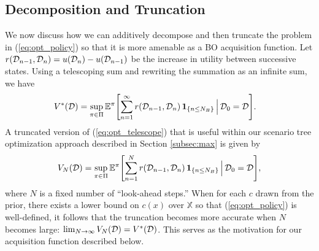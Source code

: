 \subsection{Decomposition and Truncation}
We now discuss how we can additively decompose and then truncate the problem in (\ref{eq:opt_policy}) so that it is more amenable as a BO acquisition function. Let $r(\mathcal{D}_{n-1}, \mathcal{D}_{n}) = u(\mathcal{D}_{n}) - u(\mathcal{D}_{n-1})$ be the increase in utility between successive states. Using a telescoping sum and rewriting the summation as an infinite sum, we have
\begin{align}
   V^*(\mathcal{D}) &= 
   \sup_{\pi\in\Pi} \mathbb{E}^{\pi}\Biggl[ \sum_{n=1}^{\infty} r(\mathcal{D}_{n-1},\mathcal{D}_n) \, \mathbf{1}_{\{n \le N_B\}}  \, \Bigl | \, \mathcal{D}_0 = \mathcal{D}\Biggr].
   \label{eq:opt_telescope}
\end{align}
A truncated version of (\ref{eq:opt_telescope}) that is useful within our scenario tree optimization approach described in Section \ref{subsec:max} is given by
\begin{align}
   V_N(\mathcal{D}) = \sup_{\pi\in\Pi} \mathbb{E}^{\pi}\Biggl[ \sum_{n=1}^{N} r(\mathcal{D}_{n-1},\mathcal{D}_n) \, \mathbf{1}_{\{n \le N_B\}} \, \Bigl | \, \mathcal{D}_0 = \mathcal{D}\Biggr],
   \label{eq:opt_policy_truncated_N}
\end{align}
where $N$ is a fixed number of ``look-ahead steps.'' When for each $c$ drawn from the prior, there exists a lower bound on $c(x)$ over $\mathbb X$ so that (\ref{eq:opt_policy}) is well-defined, it follows that the truncation becomes more accurate when $N$ becomes large: $\lim_{N \rightarrow \infty} V_N(\mathcal{D}) = V^*(\mathcal{D})$. This serves as the motivation for our acquisition function described below.





